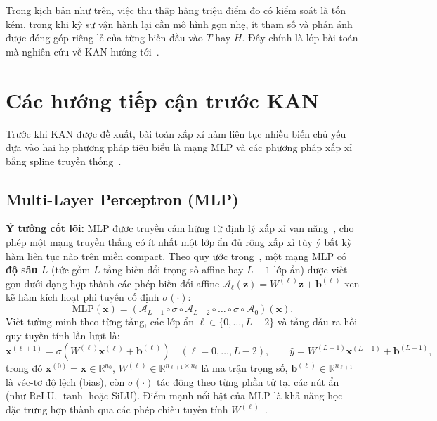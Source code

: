 Trong kịch bản như trên, việc thu thập hàng triệu điểm đo có kiểm soát là tốn kém, trong khi kỹ sư vận hành lại cần mô hình gọn nhẹ, ít tham số và phản ánh được đóng góp riêng lẻ của từng biến đầu vào $T$ hay $H$. Đây chính là lớp bài toán mà nghiên cứu về KAN hướng tới~\cite{liu2025kan}.

\section{Các hướng tiếp cận trước KAN}
Trước khi KAN được đề xuất, bài toán xấp xỉ hàm liên tục nhiều biến chủ yếu dựa vào hai họ phương pháp tiêu biểu là mạng MLP và các phương pháp xấp xỉ bằng spline truyền thống~\cite{liu2025kan}.

\subsection{Multi-Layer Perceptron (MLP)}
\textbf{Ý tưởng cốt lõi:} MLP được truyền cảm hứng từ định lý xấp xỉ vạn năng~\cite{cybenko1989approximation,hornik1989multilayer,haykin1994neural}, cho phép một mạng truyền thẳng có ít nhất một lớp ẩn đủ rộng xấp xỉ tùy ý bất kỳ hàm liên tục nào trên miền compact. Theo quy ước trong~\cite{liu2025kan}, một mạng MLP có \textbf{độ sâu $L$} (tức gồm $L$ tầng biến đổi trọng số affine hay $L-1$ lớp ẩn) được viết gọn dưới dạng hợp thành các phép biến đổi affine $\mathcal{A}_\ell(\mathbf{z}) = W^{(\ell)}\mathbf{z} + \mathbf{b}^{(\ell)}$ xen kẽ hàm kích hoạt phi tuyến cố định $\sigma(\cdot)$:
\begin{equation}\label{eq:mlp-comp}
\mathrm{MLP}(\mathbf{x}) = \left(\mathcal{A}_{L-1} \circ \sigma \circ \mathcal{A}_{L-2} \circ \dots \circ \sigma \circ \mathcal{A}_0\right)(\mathbf{x}).
\end{equation}
Viết tường minh theo từng tầng, các lớp ẩn $\ell \in \{0, \dots, L-2\}$ và tầng đầu ra hồi quy tuyến tính lần lượt là:
\begin{equation}\label{eq:mlp-layer}
\mathbf{x}^{(\ell+1)} = \sigma\!\left(W^{(\ell)}\mathbf{x}^{(\ell)} + \mathbf{b}^{(\ell)}\right) \quad (\ell = 0,\dots,L-2), \qquad \hat{y} = W^{(L-1)}\mathbf{x}^{(L-1)} + \mathbf{b}^{(L-1)},
\end{equation}
trong đó $\mathbf{x}^{(0)} = \mathbf{x} \in \mathbb{R}^{n_0}$, $W^{(\ell)} \in \mathbb{R}^{n_{\ell+1}\times n_\ell}$ là ma trận trọng số, $\mathbf{b}^{(\ell)} \in \mathbb{R}^{n_{\ell+1}}$ là véc-tơ độ lệch (bias), còn $\sigma(\cdot)$ tác động theo từng phần tử tại các nút ẩn (như $\mathrm{ReLU}$, $\tanh$ hoặc $\mathrm{SiLU}$). Điểm mạnh nổi bật của MLP là khả năng học đặc trưng hợp thành qua các phép chiếu tuyến tính $W^{(\ell)}$~\cite{liu2025kan}.

